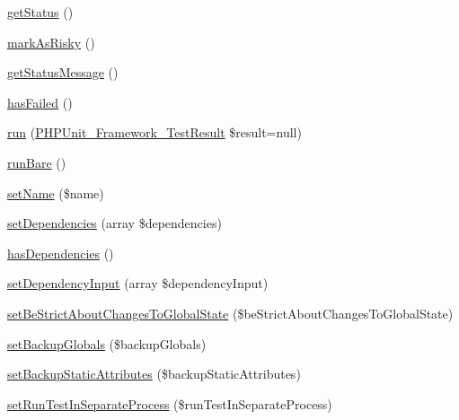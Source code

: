 \begin{DoxyCompactItemize}
\item 
\mbox{\hyperlink{class_p_h_p_unit___framework___test_case_a9d21636071f529e2154051d3ea6e5921}{get\+Status}} ()
\item 
\mbox{\hyperlink{class_p_h_p_unit___framework___test_case_ab84727f648e3670804a8b8d6b27f452f}{mark\+As\+Risky}} ()
\item 
\mbox{\hyperlink{class_p_h_p_unit___framework___test_case_a2a439fe85a00a9f9ae601a2ba2f9adbe}{get\+Status\+Message}} ()
\item 
\mbox{\hyperlink{class_p_h_p_unit___framework___test_case_aab52cf3183d564c0d8ec05c4dffb13dd}{has\+Failed}} ()
\item 
\mbox{\hyperlink{class_p_h_p_unit___framework___test_case_aba2e5a83092b40735a7a61c572cd6256}{run}} (\mbox{\hyperlink{class_p_h_p_unit___framework___test_result}{P\+H\+P\+Unit\+\_\+\+Framework\+\_\+\+Test\+Result}} \$result=null)
\item 
\mbox{\hyperlink{class_p_h_p_unit___framework___test_case_a3473c953293b878519f7e2441c6ae4ef}{run\+Bare}} ()
\item 
\mbox{\hyperlink{class_p_h_p_unit___framework___test_case_a2fe666694997d047711d7653eca2f132}{set\+Name}} (\$name)
\item 
\mbox{\hyperlink{class_p_h_p_unit___framework___test_case_ace722f9667f0876106c3eb82f91388bd}{set\+Dependencies}} (array \$dependencies)
\item 
\mbox{\hyperlink{class_p_h_p_unit___framework___test_case_a83af3019fcdf169a7367af4696b781fb}{has\+Dependencies}} ()
\item 
\mbox{\hyperlink{class_p_h_p_unit___framework___test_case_a8f35fc800879875d8e66803edc72eb15}{set\+Dependency\+Input}} (array \$dependency\+Input)
\item 
\mbox{\hyperlink{class_p_h_p_unit___framework___test_case_a60888e4ba273ecf8276a846a15a7b183}{set\+Be\+Strict\+About\+Changes\+To\+Global\+State}} (\$be\+Strict\+About\+Changes\+To\+Global\+State)
\item 
\mbox{\hyperlink{class_p_h_p_unit___framework___test_case_a05198848657e1a00f153eb72b586d6be}{set\+Backup\+Globals}} (\$backup\+Globals)
\item 
\mbox{\hyperlink{class_p_h_p_unit___framework___test_case_a7f2ed8943e4b0713c34c9b6e3cf2bea8}{set\+Backup\+Static\+Attributes}} (\$backup\+Static\+Attributes)
\item 
\mbox{\hyperlink{class_p_h_p_unit___framework___test_case_a0cef8c0001d1beb9c775897699ea4f54}{set\+Run\+Test\+In\+Separate\+Process}} (\$run\+Test\+In\+Separate\+Process)

\end{DoxyCompactItemize}
